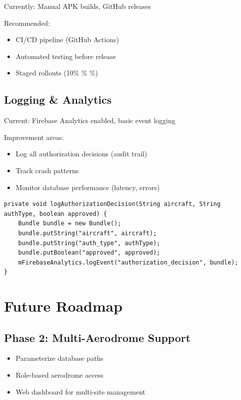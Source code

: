 \documentclass[11pt,a4paper]{report}
\begin{document}
Currently: Manual APK builds, GitHub releases

Recommended:
\begin{itemize}
    \item CI/CD pipeline (GitHub Actions)
    \item Automated testing before release
    \item Staged rollouts (10\% \% \%)
\end{itemize}

\subsection{Logging \& Analytics}

Current: Firebase Analytics enabled, basic event logging

Improvement areas:
\begin{itemize}
    \item Log all authorization decisions (audit trail)
    \item Track crash patterns
    \item Monitor database performance (latency, errors)
\end{itemize}

\begin{lstlisting}
private void logAuthorizationDecision(String aircraft, String authType, boolean approved) {
    Bundle bundle = new Bundle();
    bundle.putString("aircraft", aircraft);
    bundle.putString("auth_type", authType);
    bundle.putBoolean("approved", approved);
    mFirebaseAnalytics.logEvent("authorization_decision", bundle);
}
\end{lstlisting}

\section{Future Roadmap}

\subsection{Phase 2: Multi-Aerodrome Support}

\begin{itemize}
    \item Parameterize database paths
    \item Role-based aerodrome access
    \item Web dashboard for multi-site management
\end{itemize}
\end{document}
